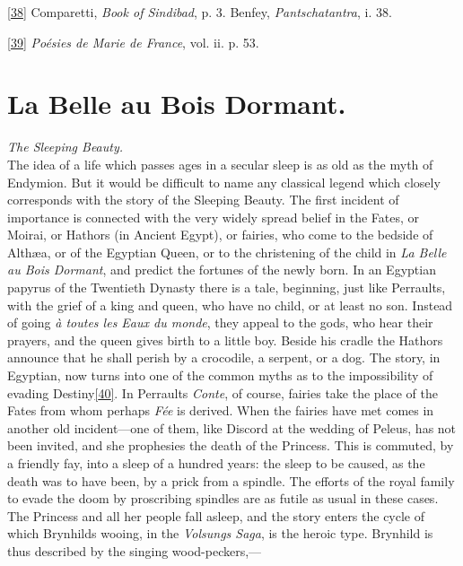 \documentclass[14pt,a4paper]{memoir}
\begin{document}
\protect\hypertarget{4533318093929944247_33931-h-0.htm.xhtmlux5cux23Footnote_38}{}{}\protect\hyperlink{4533318093929944247_33931-h-0.htm.xhtmlux5cux23FNanchor_38}{{{[}38{]}}}
Comparetti, \emph{Book of Sindibad}, p. 3. Benfey,
\emph{Pantschatantra}, i. 38.

\protect\hypertarget{4533318093929944247_33931-h-0.htm.xhtmlux5cux23Footnote_39}{}{}\protect\hyperlink{4533318093929944247_33931-h-0.htm.xhtmlux5cux23FNanchor_39}{{{[}39{]}}}
\emph{Poésies de Marie de France}, vol. ii. p. 53.

\section{La Belle au Bois Dormant.}

\emph{The Sleeping Beauty.} \\

The idea of a life which passes ages in a secular sleep is as old as the
myth of Endymion. But it would be difficult to name any classical legend
which closely corresponds with the story of the Sleeping Beauty. The
first incident of importance is connected with the very widely spread
belief in the Fates, or Moirai, or Hathors (in Ancient Egypt), or
fairies, who come to the bedside of Althæa, or of the Egyptian Queen, or
to the christening of the child in \emph{La Belle au Bois Dormant}, and
predict the fortunes of the newly born. In an Egyptian papyrus of the
Twentieth Dynasty there is a tale, beginning, just like
Perrault\textquotesingle s, with the grief of a king and queen, who have
no child, or at least no son. Instead of going \emph{à toutes les Eaux
du monde}, they appeal to the gods, who hear their prayers, and the
queen gives birth to a little boy. Beside his cradle the Hathors
announce that he shall perish by a crocodile, a serpent, or a dog. The
story, in Egyptian, now turns into one of the common myths as to the
impossibility of evading
Destiny\protect\hypertarget{4533318093929944247_33931-h-0.htm.xhtmlux5cux23FNanchor_40}{}{}\protect\hyperlink{4533318093929944247_33931-h-0.htm.xhtmlux5cux23Footnote_40}{{[}40{]}}.
In Perrault\textquotesingle s \emph{Conte}, of course, fairies take the
place of the Fates from whom perhaps \emph{Fée} is derived. When the
fairies have met comes in another old incident---one of them, like
Discord at the wedding of Peleus, has not been invited, and she
prophesies the death of the Princess. This is commuted, by a friendly
fay, into a sleep of a hundred years: the sleep to be caused, as the
death was to have been, by a prick from a spindle. The efforts of the
royal family to evade the doom by proscribing spindles are as futile as
usual in these cases. The Princess and all her people fall asleep, and
the story enters the cycle of which Brynhild\textquotesingle s wooing,
in the \emph{Volsung\textquotesingle s Saga}, is the heroic type.
Brynhild is thus described by the singing wood-peckers,---
\end{document}
